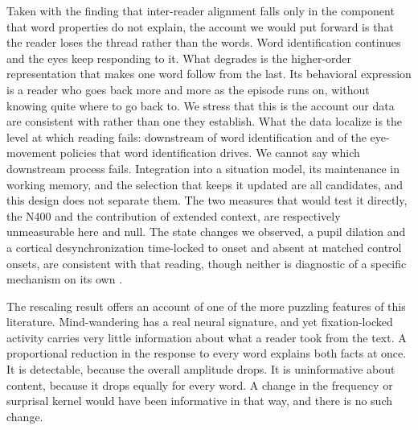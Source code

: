 \documentclass[11pt]{article}
\begin{document}
Taken with the finding that inter-reader alignment falls only in the component that word
properties do not explain, the account we would put forward is that the reader loses the thread
rather than the words. Word identification continues and the eyes keep responding to it. What degrades is the higher-order representation that makes one word follow from the last. Its
behavioral expression is a reader who goes back more and more as the episode runs on, without
knowing quite where to go back to. We stress that this is the account our data are consistent with rather than one they establish. What the data localize is the level at which reading fails: downstream of word identification and of the eye-movement policies that word identification drives. We cannot say which downstream process fails. Integration into a situation model, its maintenance
in working memory, and the selection that keeps it updated are all candidates, and this design
does not separate them. The two measures that would test it directly,
the N400 and the contribution of extended context, are respectively unmeasurable here and null. The state changes we observed, a pupil dilation
and a cortical desynchronization time-locked to onset and absent at matched control onsets,
are consistent with that reading, though neither is diagnostic of a specific mechanism on its
own \citep{smallwood2011pupil,kam2011,braboszcz2011}.

The rescaling result offers an account of one of the more puzzling features of this literature.
Mind-wandering has a real neural signature, and yet fixation-locked activity carries very little
information about what a reader took from the text. A proportional reduction in the response to
every word explains both facts at once. It is detectable, because the overall amplitude drops.
It is uninformative about content, because it drops equally for every word. A change in the
frequency or surprisal kernel would have been informative in that way, and there is no such
change.
\end{document}
